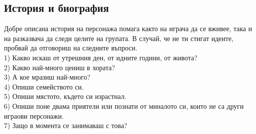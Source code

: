 \subsection{История и биография}
Добре описана история на персонажа помага както на играча да се вживее, така и на разказвача да следи целите на групата.
В случай, че не ти стигат идеите, пробвай да отговориш на следните въпроси.                       \\
1) Какво искаш от утрешния ден, от идните години, от живота?                                      \\
2) Какво най-много цениш в хората?                                                                \\
3) А кое мразиш най-много?                                                                        \\
4) Опиши семейството си.                                                                          \\
5) Опиши мястото, където си израстнал.                                                            \\
6) Опиши поне двама приятели или познати от миналото си, които не са други играови персонажи.     \\
7) Защо в момента се занимаваш с това?                                                            \\

